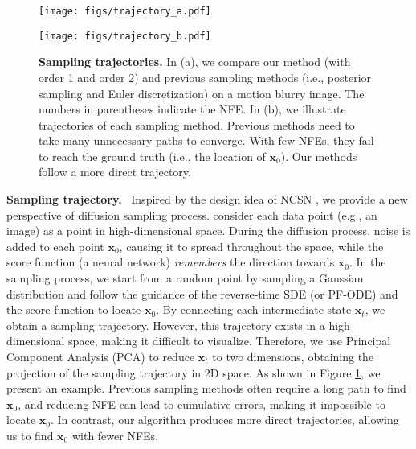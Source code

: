 \begin{figure}[ht!]
    \centering
    \begin{minipage}[t]{0.6\linewidth}
        \centering
        \texttt{[image: figs/trajectory\_a.pdf]} %
        \label{fig:traj(a)}
    \end{minipage}
    \begin{minipage}[t]{0.35\linewidth}
        \centering
        \texttt{[image: figs/trajectory\_b.pdf]} %
        \label{fig:traj(b)}
    \end{minipage}
    \caption{\textbf{Sampling trajectories.} In (a), we compare our method (with order 1 and order 2) and previous sampling methods (i.e., posterior sampling and Euler discretization) on a motion blurry image. The numbers in parentheses indicate the NFE. In (b), we illustrate trajectories of each sampling method. Previous methods need to take many unnecessary paths to converge. With few NFEs, they fail to reach the ground truth (i.e., the location of $\boldsymbol{x}_0$). Our methods follow a more direct trajectory.}
    \label{fig:traj}
\end{figure}

\textbf{Sampling trajectory.}~ Inspired by the design idea of NCSN \citep{song2019ncsn}, we provide a new perspective of diffusion sampling process. \cite{song2019ncsn} consider each data point (e.g., an image) as a point in high-dimensional space. During the diffusion process, noise is added to each point $\boldsymbol{x}_0$, causing it to spread throughout the space, while the score function (a neural network) \textit{remembers} the direction towards $\boldsymbol{x}_0$. In the sampling process, we start from a random point by sampling a Gaussian distribution and follow the guidance of the reverse-time SDE (or PF-ODE) and the score function to locate $\boldsymbol{x}_0$. By connecting each intermediate state $\boldsymbol{x}_t$, we obtain a sampling trajectory. However, this trajectory exists in a high-dimensional space, making it difficult to visualize. Therefore, we use Principal Component Analysis (PCA) to reduce $\boldsymbol{x}_t$ to two dimensions, obtaining the projection of the sampling trajectory in 2D space. As shown in Figure \ref{fig:traj}, we present an example. Previous sampling methods \citep{luo2024posterior} often require a long path to find $\boldsymbol{x}_0$, and reducing NFE can lead to cumulative errors, making it impossible to locate $\boldsymbol{x}_0$. In contrast, our algorithm produces more direct trajectories, allowing us to find $\boldsymbol{x}_0$ with fewer NFEs.

